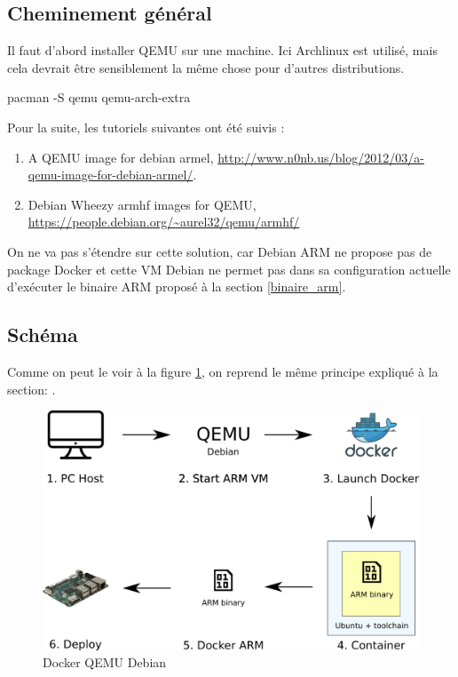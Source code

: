 \documentclass[11pt,a4paper,oneside]{report}
\begin{document}
\subsection{Cheminement général}

Il faut d'abord installer QEMU sur une machine. Ici Archlinux est utilisé, mais cela devrait être sensiblement la même chose pour d'autres distributions.

\label{install_qemu_arch}
\begin{bashcode}
pacman -S qemu qemu-arch-extra
\end{bashcode}

Pour la suite, les tutoriels suivantes ont été suivis : 
\begin{enumerate}
\item A QEMU image for debian armel, \url{http://www.n0nb.us/blog/2012/03/a-qemu-image-for-debian-armel/}.
\item Debian Wheezy armhf images for QEMU, \url{https://people.debian.org/~aurel32/qemu/armhf/}
\end{enumerate}

On ne va pas s'étendre sur cette solution, car Debian ARM ne propose pas de package Docker et cette VM Debian ne permet pas dans sa configuration actuelle d'exécuter le binaire ARM proposé à la section \ref{binaire_arm}.

\subsection{Schéma}

Comme on peut le voir à la figure \ref{fig_docker_qemu}, on reprend le même principe expliqué à la section: .

\begin{figure}[H]
    \begin{center}
        \includegraphics[scale=0.5]{img/docker_qemu_debian}
    \end{center}
    \caption{Docker QEMU Debian}
    \label{fig_docker_qemu}
\end{figure}
\end{document}
